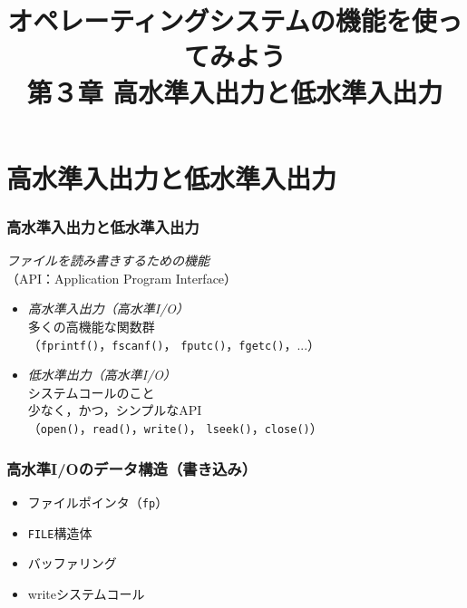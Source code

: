 \documentclass{beamer}                 %
\begin{document}
\title{オペレーティングシステムの機能を使ってみよう\\
第３章 高水準入出力と低水準入出力}
\date{}

\begin{frame}
  \titlepage
\end{frame}


\section{高水準入出力と低水準入出力}
\begin{frame}
  \frametitle{高水準入出力と低水準入出力}
  \emph{ファイルを読み書きするための機能} \\
  （API：Application Program Interface）
  \begin{itemize}
  \item \emph{高水準入出力（高水準I/O）} \\
    多くの高機能な関数群\\
    （\texttt{fprintf()}，\texttt{fscanf()}，
      \texttt{fputc()}，\texttt{fgetc()}，...）
  \item \emph{低水準出力（高水準I/O）} \\
    システムコールのこと \\
    少なく，かつ，シンプルなAPI \\
    （\texttt{open()}，\texttt{read()}，\texttt{write()}，
      \texttt{lseek()}，\texttt{close()}）
  \end{itemize}
\end{frame}

\begin{frame}
  \frametitle{高水準I/Oのデータ構造（書き込み）}
  \begin{itemize}
  \item ファイルポインタ（\texttt{fp}）
  \item \texttt{FILE}構造体
  \item バッファリング
  \item writeシステムコール
  \end{itemize}
\end{frame}
\end{document}
